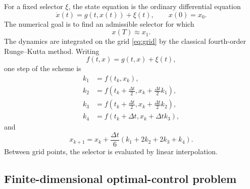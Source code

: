 \documentclass[11pt]{article}
\theoremstyle{definition}
\theoremstyle{remark}
\begin{document}
For a fixed selector $\xi$, the state equation is the ordinary differential equation
\begin{equation}
    \dot{x}(t)=g(t,x(t))+\xi(t), \qquad x(0)=x_0.
    \label{eq:state-dynamics}
\end{equation}
The numerical goal is to find an admissible selector for which
\begin{equation}
    x(T)\approx x_1.
\end{equation}
The dynamics are integrated on the grid \eqref{eq:grid} by the classical fourth-order Runge--Kutta method. Writing
\begin{equation}
    f(t,x)=g(t,x)+\xi(t),
\end{equation}
one step of the scheme is
\begin{align}
    k_1 &= f(t_k,x_k),\nonumber\\
    k_2 &= f\left(t_k+\frac{\Delta t}{2},x_k+\frac{\Delta t}{2}k_1\right),\nonumber\\
    k_3 &= f\left(t_k+\frac{\Delta t}{2},x_k+\frac{\Delta t}{2}k_2\right),\nonumber\\
    k_4 &= f(t_k+\Delta t,x_k+\Delta t k_3),\nonumber
\end{align}
and
\begin{equation}
    x_{k+1}=x_k+\frac{\Delta t}{6}\left(k_1+2k_2+2k_3+k_4\right).
    \label{eq:rk4}
\end{equation}
Between grid points, the selector is evaluated by linear interpolation.

\subsection{Finite-dimensional optimal-control problem}
\end{document}
